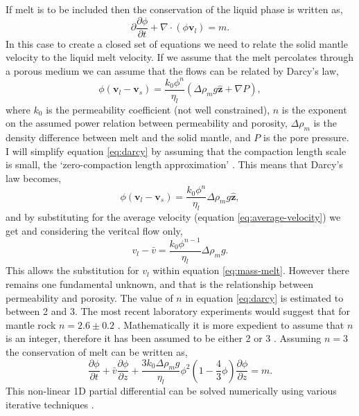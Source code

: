 \begin{subappendices}
If melt is to be included then the conservation of the liquid phase is written as,
\begin{equation}
\partial
\frac{\partial \phi}{\partial t} + \nabla \cdot \left( \phi \mathbf{v}_{l} \right) = m.
\label{eq:mass-melt}
\end{equation}
In this case to create a closed set of equations we need to relate the solid mantle velocity to the liquid melt velocity. If we assume that the melt percolates through a porous medium we can assume that the flows can be related by Darcy's law,
\begin{equation}
\phi\left( \mathbf{v}_{l}-\mathbf{v}_{s} \right) = \frac{k_{0}\phi^{n}}{\eta_{l}}\left( \Delta\rho_{m}g\hat{\mathbf{z}} + \nabla P \right),
\label{eq:darcy}
\end{equation}
where $k_{0}$ is the permeability coefficient (not well constrained), $n$ is the exponent on the assumed power relation between permeability and porosity, $\Delta\rho_{m}$ is the density difference between melt and the solid mantle, and $P$ is the pore pressure. I will simplify equation \ref{eq:darcy} by assuming that the compaction length scale is small, the `zero-compaction length approximation' \citep{ribe-1985}. This means that Darcy's law becomes,
\begin{equation}
\phi\left( \mathbf{v}_{l}-\mathbf{v}_{s} \right) = \frac{k_{0}\phi^{n}}{\eta_{l}}\Delta\rho_{m}g\hat{\mathbf{z}},
\end{equation}
and by substituting for the average velocity (equation \ref{eq:average-velocity}) we get and considering the veritcal flow only,
\begin{equation}
v_{l}-\bar{v} = \frac{k_{0}\phi^{n-1}}{\eta_{l}}\Delta\rho_{m}g.
\end{equation}
This allows the substitution for $v_{l}$ within equation \ref{eq:mass-melt}. However there remains one fundamental unknown, and that is the relationship between permeability and porosity. The value of $n$ in equation \ref{eq:darcy} is estimated to between 2 and 3. The most recent laboratory experiments would suggest that for mantle rock $n = 2.6\pm0.2$ \citep{miller-etal-2014}. Mathematically it is more expedient to assume that $n$ is an integer, therefore it has been assumed to be either 2 \citep[e.g.][]{scott-1989,goes-etal-2012} or 3 \citep[e.g.][]{hewitt-2010,armitage-etal-grl-2019}. Assuming $n=3$ the conservation of melt can be written as,
\begin{equation}
\frac{\partial \phi}{\partial t} + \bar{v}\frac{\partial \phi}{\partial z} + \frac{3k_{0}\Delta\rho_{m}g}{\eta_{l}}\phi^{2}\left( 1-\frac{4}{3}\phi \right)\frac{\partial \phi}{\partial z} = m.
\end{equation}
This non-linear 1D partial differential can be solved numerically using various iterative techniques \citep[e.g.][]{armitage-etal-grl-2019,franken-etal-2020}.


\end{subappendices}
